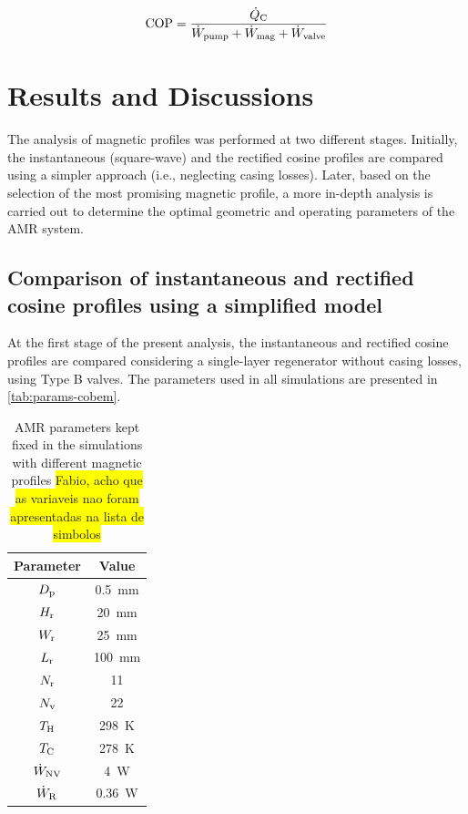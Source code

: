 \documentclass[referee]{svjour3}
\begin{document}
\begin{equation}
  \label{eq:112}
  \mathrm{COP} = \frac{\dot{Q}_{\mathrm{C}}}{\dot{W}_{\mathrm{pump}} + \dot{W}_{\mathrm{mag}} + \dot{W}_{\mathrm{valve}}}
\end{equation}



\section{Results and Discussions}
\label{sec:results-discussions}

The analysis of magnetic profiles was performed at two different stages. Initially, the instantaneous (square-wave) and the rectified cosine profiles are compared using a simpler approach (i.e., neglecting casing losses). Later, based on the selection of the most promising magnetic profile, a more in-depth analysis is carried out to determine the optimal geometric and operating parameters of the AMR system.

\subsection{Comparison of instantaneous and rectified cosine profiles using a simplified model}
\label{sec:comp-cosine-inst}

At the first stage of the present analysis, the instantaneous and rectified cosine profiles are compared considering a single-layer regenerator  without casing losses, using Type B valves. The parameters used in all simulations are presented in \autoref{tab:params-cobem}.

\begin{table}[!ht]
  \centering
  \caption{AMR parameters kept fixed in the simulations with different magnetic profiles \colorbox{yellow}{Fabio, acho que as variaveis nao foram apresentadas na lista de simbolos}}
  \begin{tabular}{c|c}
\hline
\textbf{Parameter} & \textbf{Value}\\
\hline
   $D_{\mathrm{p}}$ & \SI{0.5}{\mm}\\
$H_{\mathrm{r}}$ & \SI{20}{\mm}\\
$W_{\mathrm{r}}$ & \SI{25}{\mm}\\
$L_{\mathrm{r}}$ & \SI{100}{\mm}\\
$N_{\mathrm{r}}$ & 11 \\
$N_{\mathrm{v}}$ & 22 \\
$T_{\mathrm{H}}$ & \SI{298}{\kelvin}\\
$T_{\mathrm{C}}$ & \SI{278}{\kelvin}\\
$\dot{W}_{\mathrm{NV}}$ & \SI{4}{\watt}\\
$\dot{W}_{\mathrm{R}}$ & \SI{0.36}{\watt}\\
\hline
  \end{tabular}

  \label{tab:params-cobem}
\end{table}
\end{document}
